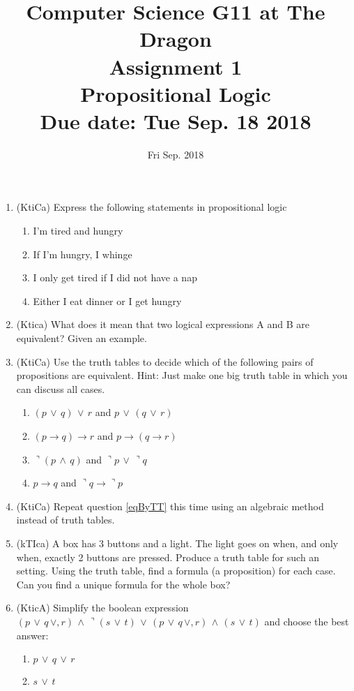 \documentclass{article}
\title{
Computer Science G11 at The Dragon \\
Assignment 1 \\
Propositional Logic\\
\bf{Due date: Tue Sep. 18 2018}
}
\begin{document}
\maketitle
\date{Fri Sep. 2018}


\begin{enumerate}
\item (KtiCa) Express the following statements in propositional logic
\begin{enumerate}
\item I'm tired and hungry
\item If I'm hungry, I whinge
\item I only get tired if I did not have a nap
\item Either I eat dinner or I get hungry
\end{enumerate}
\item (Ktica) What does it mean that two logical expressions A and B are equivalent? Given an example.
\item \label{eqByTT} (KtiCa) Use the truth tables to decide which of the following pairs of propositions are equivalent. Hint: Just make one big truth table in
which you can discuss all cases.
\begin{enumerate}
\item $(p\,\vee\,q)\,\vee\,r $ and $p\,\vee\,(q\,\vee\,r)$
\item $(p\rightarrow q)\rightarrow r$ and $p\rightarrow (q\rightarrow r)$
\item $\urcorner (p\,\wedge\,q)$ and $\urcorner p\,\vee\,\urcorner q$
\item $p\rightarrow q$ and $\urcorner q \rightarrow \urcorner p$
\end{enumerate}
\item (KtiCa) Repeat question \ref{eqByTT} this time using an algebraic method instead of truth tables.
\item (kTIca) A box has 3 buttons and a light. The light goes on when, and only when, exactly 2 buttons are pressed. Produce a truth table for 
such an setting. Using the truth table, find a formula (a proposition) for each case. Can you find a unique formula for the whole box?
\item (KticA) Simplify the boolean expression $(p\,\vee\,q\,\vee,r)\,\wedge\,\urcorner (s\,\vee\,t)\,\vee\,(p\,\vee\,q\,\vee,r)\,\wedge\,(s\,\vee\,t)$ 
and choose the best answer:
\begin{enumerate}
\item $p\,\vee\,q\,\vee\,r$
\item $s\,\vee\,t$

\end{enumerate}
\end{enumerate}
\end{document}
